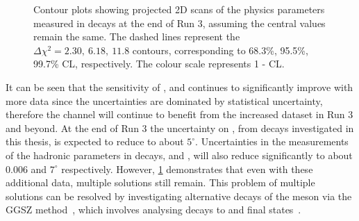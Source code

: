 \begin{figure}[h]
\centering
{}
\caption{Contour plots showing projected 2D scans of the physics parameters measured in \btodkst decays at the end of Run 3, assuming the central values remain the same. The dashed lines represent the $\Delta \chi^2 = 2.30,\ 6.18,\ 11.8$ contours, corresponding to 68.3\%, 95.5\%, 99.7\% CL, respectively. The colour scale represents 1 - CL.}
\label{gammadiniplotsrun3}
\end{figure}

It can be seen that the sensitivity of \rb, \deltab and \Pgamma continues to significantly improve with more data since the uncertainties are dominated by statistical uncertainty, therefore the \btodkst channel will continue to benefit from the increased dataset in Run 3 and beyond. At the end of Run 3 the uncertainty on \Pgamma, from \btodkst decays investigated in this thesis, is expected to reduce to about $5^{\circ}$. Uncertainties in the measurements of the hadronic parameters in \btodkst decays, \rb and \deltab, will also reduce significantly to about $0.006$ and $7^{\circ}$ respectively. However, \fig\ref{gammadiniplotsrun3} demonstrates that even with these additional data, multiple solutions still remain. This problem of multiple solutions can be resolved by investigating alternative decays of the \Dz meson via the GGSZ method~\cite{GGSZ}, which involves analysing \Dz decays to \KS\pip\pim and \KS\Kp\Km final states~\cite{LHCb-PAPER-2012-027,LHCb-PAPER-2014-041}.


